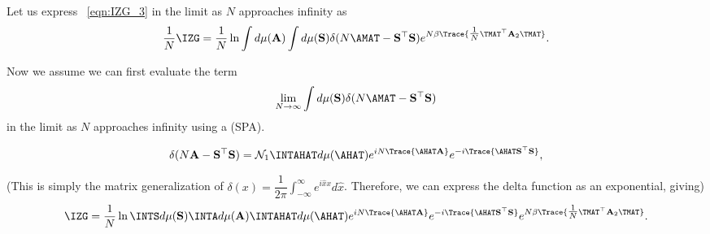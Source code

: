 Let us express \EQN~\ref{eqn:IZG_3} in the limit as $N$ approaches infinity as
\begin{align}
  \label{eqn:IZG_4}
  \frac{1}{N}\IZG =
  \frac{1}{N} \ln
  \int d\mu(\mathbf{A})
  \int d\mu(\mathbf{S})
  \delta(N\AMAT-\mathbf{S}^{\top}\mathbf{S})
  e^{ N\beta \Trace{ \tfrac{1}{N} \TMAT^{\top}\mathbf{A}_{2}\TMAT } }  .
\end{align}
 
Now we assume we can first evaluate the term 
\begin{align}
  \lim_{N\rightarrow\infty} \int d\mu(\mathbf{S}) \delta(N\AMAT-\mathbf{S}^{\top}\mathbf{S})
\end{align}
in the limit as $N$ approaches infinity using a \SaddlePointApproximation (SPA).

\begin{align}
\delta(N\mathbf{A}-\mathbf{S}^{\top}\mathbf{S})
   =\mathcal{N}_1\INTAHAT d\mu(\AHAT) e^{ iN \Trace{ \AHAT\mathbf{A} } }
   e^{ -i \Trace{ \AHAT\mathbf{S}^{\top} \mathbf{S} } }  ,
\end{align}

\noindent
(This is simply the matrix generalization of 
$\delta(x)=\dfrac{1}{2\pi}\int_{-\infty}^{\infty} e^{i\hat{x}x}d\hat{x}$.
Therefore, we can express the delta function as an exponential, giving)
\begin{align}
\label{eqn:Q2}
\IZG = \frac{1}{N} \ln\INTS d\mu(\mathbf{S}) \INTA d\mu(\mathbf{A}) 
                           \INTAHAT d\mu(\AHAT) e^{ iN \Trace{ \AHAT\mathbf{A} } }
                           e^{ -i \Trace{ \AHAT\mathbf{S}^{\top} \mathbf{S} } }
                           e^{  N\beta \Trace{ \tfrac{1}{N} \TMAT^{\top}\mathbf{A}_{2}\TMAT } } .
\end{align}

